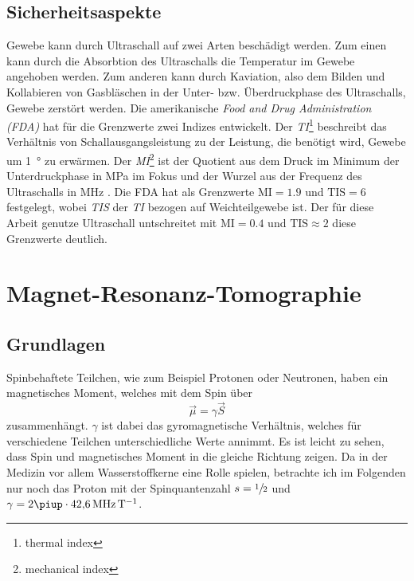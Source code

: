 \documentclass[
    11pt,
    ngerman
]{scrbook}
\begin{document}
\subsection{Sicherheitsaspekte}

Gewebe kann durch Ultraschall auf zwei Arten beschädigt werden. Zum einen kann
durch die Absorbtion des Ultraschalls die Temperatur im Gewebe angehoben
werden. Zum anderen kann durch Kaviation, also dem Bilden und Kollabieren von
Gasbläschen in der Unter- bzw. Überdruckphase des Ultraschalls, Gewebe
zerstört werden. Die amerikanische \emph{Food and Drug Administration (FDA)}
hat für die Grenzwerte zwei Indizes entwickelt. Der \emph{TI}\footnote{thermal
index} beschreibt das Verhältnis von Schallausgangsleistung zu der Leistung,
die benötigt wird, Gewebe um \SI{1}{\degree} zu erwärmen. Der
\emph{MI}\footnote{mechanical index} ist der Quotient aus dem Druck im Minimum
der Unterdruckphase in \si{\mega\pascal} im Fokus und der Wurzel aus der
Frequenz des Ultraschalls in \si{\mega\hertz}
\parencite{FDA_ultrasound_limits}. Die FDA hat als Grenzwerte
$\text{MI}=\num{1.9}$ und $\text{TIS}=6$ festgelegt, wobei \emph{TIS} der
\emph{TI} bezogen auf Weichteilgewebe ist.  Der für diese Arbeit genutze
Ultraschall untschreitet mit $\text{MI}=\num{0.4}$ und $\text{TIS}\approx2$
\parencite{diss_radicke} diese Grenzwerte deutlich.

\section{Magnet-Resonanz-Tomographie}

\subsection{Grundlagen}

Spinbehaftete Teilchen, wie zum Beispiel Protonen oder Neutronen, haben ein magnetisches Moment, welches mit dem Spin über
\[
    \vec\mu = \gamma\vec S
\]
zusammenhängt. $\gamma$ ist dabei das gyromagnetische Verhältnis, welches für
verschiedene Teilchen unterschiedliche Werte annimmt. Es ist leicht zu sehen,
dass Spin und magnetisches Moment in die gleiche Richtung zeigen. Da in der
Medizin vor allem Wasserstoffkerne eine Rolle spielen, betrachte ich im
Folgenden nur noch das Proton mit der Spinquantenzahl $s = \sfrac12$ und $\gamma =
2\piup\cdot\SI{42.6}{\mega\hertz\per\tesla}$.
\end{document}
